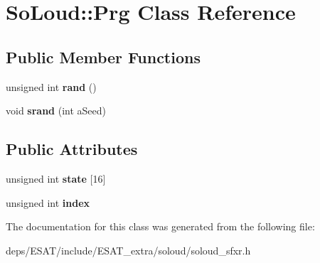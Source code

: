 \hypertarget{class_so_loud_1_1_prg}{}\section{So\+Loud\+:\+:Prg Class Reference}
\label{class_so_loud_1_1_prg}
\subsection*{Public Member Functions}
\begin{DoxyCompactItemize}
\item 
\mbox{\label{class_so_loud_1_1_prg_ad7db86d3e5c6f51cda700e7cd463d22b}} 
unsigned int {\bfseries rand} ()
\item 
\mbox{\label{class_so_loud_1_1_prg_a1d33644b5a1762da455e3c674ed4fc66}} 
void {\bfseries srand} (int a\+Seed)
\end{DoxyCompactItemize}
\subsection*{Public Attributes}
\begin{DoxyCompactItemize}
\item 
\mbox{\label{class_so_loud_1_1_prg_a48dd298724024c53d335184467966318}} 
unsigned int {\bfseries state} \mbox{[}16\mbox{]}
\item 
\mbox{\label{class_so_loud_1_1_prg_ad8cad4f23882db3fb5334592c1fb2674}} 
unsigned int {\bfseries index}
\end{DoxyCompactItemize}


The documentation for this class was generated from the following file\+:\begin{DoxyCompactItemize}
\item 
deps/\+E\+S\+A\+T/include/\+E\+S\+A\+T\+\_\+extra/soloud/soloud\+\_\+sfxr.\+h\end{DoxyCompactItemize}
